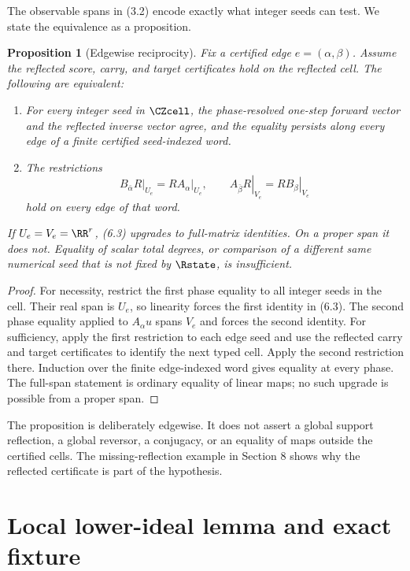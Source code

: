 \documentclass[11pt]{article}
\newtheorem{proposition}[theorem]{Proposition}
\theoremstyle{definition}
\theoremstyle{remark}
\begin{document}
The observable spans in (3.2) encode exactly what integer seeds can test.
We state the equivalence as a proposition.

\begin{proposition}[Edgewise reciprocity]
\label{prop:reciprocity}
Fix a certified edge $e=(\alpha,\beta)$.  Assume the reflected score,
carry, and target certificates hold on the reflected cell.  The following
are equivalent:
\begin{enumerate}[label=(\roman*)]
\item For every integer seed in $\CZcell$, the phase-resolved one-step
  forward vector and the reflected inverse vector agree, and the equality
  persists along every edge of a finite certified seed-indexed word.
\item The restrictions
\[
 \left.B_{\bar\alpha}R\right|_{U_e}
 =\left.RA_\alpha\right|_{U_e},\qquad
 \left.A_{\bar\beta}R\right|_{V_e}
 =\left.RB_\beta\right|_{V_e}
\tag{6.3}
\]
hold on every edge of that word.
\end{enumerate}
If $U_e=V_e=\RR^r$, (6.3) upgrades to full-matrix identities.  On a proper
span it does not.  Equality of scalar total degrees, or comparison of a
different same numerical seed that is not fixed by $\Rstate$, is insufficient.
\end{proposition}

\begin{proof}
For necessity, restrict the first phase equality to all integer seeds in
the cell.  Their real span is $U_e$, so linearity forces the first identity
in (6.3).  The second phase equality applied to $A_\alpha u$ spans $V_e$
and forces the second identity.  For sufficiency, apply the first
restriction to each edge seed and use the reflected carry and target
certificates to identify the next typed cell.  Apply the second restriction
there.  Induction over the finite edge-indexed word gives equality at every
phase.  The full-span statement is ordinary equality of linear maps; no
such upgrade is possible from a proper span.
\end{proof}

The proposition is deliberately edgewise.  It does not assert a global
support reflection, a global reversor, a conjugacy, or an equality of maps
outside the certified cells.  The missing-reflection example in Section 8
shows why the reflected certificate is part of the hypothesis.

\section{Local lower-ideal lemma and exact fixture}
\end{document}

